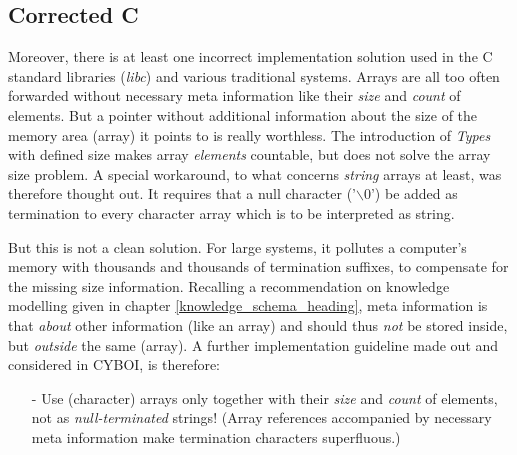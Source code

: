 %
%
%
%
%
%
%

\subsection{Corrected C}
\label{corrected_c_heading}

Moreover, there is at least one incorrect implementation solution used in the C
standard libraries (\emph{libc}) and various traditional systems. Arrays are
all too often forwarded without necessary meta information like their
\emph{size} and \emph{count} of elements. But a pointer without additional
information about the size of the memory area (array) it points to is really
worthless. The introduction of \emph{Types} with defined size makes array
\emph{elements} countable, but does not solve the array size problem. A special
workaround, to what concerns \emph{string} arrays at least, was therefore
thought out. It requires that a null character ('$\backslash$0') be added as
termination to every character array which is to be interpreted as string.

But this is not a clean solution. For large systems, it pollutes a computer's
memory with thousands and thousands of termination suffixes, to compensate for
the missing size information. Recalling a recommendation on knowledge modelling
given in chapter \ref{knowledge_schema_heading}, meta information is that
\emph{about} other information (like an array) and should thus \emph{not} be
stored inside, but \emph{outside} the same (array). A further implementation
guideline made out and considered in CYBOI, is therefore:

\begin{itemize}
    \item[-] Use (character) arrays only together with their \emph{size} and
        \emph{count} of elements, not as \emph{null-terminated} strings! (Array
        references accompanied by necessary meta information make termination
        characters superfluous.)
\end{itemize}

